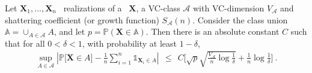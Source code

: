 

\begin{theorem}
\label{colt:thm-princ} 
Let $\mathbf{X}_1,\ldots,\mathbf{X}_n$ \iid~realizations of a \rv~$\mathbf{X}$, a VC-class $\mathcal{A}$ with VC-dimension $V_{\mathcal{A}}$ and shattering coefficient (or growth function) $S_{\mathcal{A}}(n)$.
Consider the class union $\mathbb{A} = \cup_{A \in \mathcal{A}} A$,
 and let  
$p = \mathbb{P}(\mathbf{X} \in \mathbb{A})$. Then there is an absolute constant $C$ such that for all $0<\delta<1$, with probability at least $1-\delta$,
\begin{align}
\label{colt:thm-princ-ineq}
\sup_{A \in \mathcal{A}} \left| \mathbb{P} \big[\mathbf{X} \in A\big] - \frac{1}{n} \sum_{i=1}^n \mathds{1}_{\mathbf{X}_i \in A}  \right| ~~\le~~ C \bigg[ \sqrt{p}\sqrt{\frac{V_{\mathcal{A}}}{n} \log{\frac{1}{\delta}}} + \frac{1}{n} \log{\frac{1}{\delta}} \bigg]~.
\end{align}
\end{theorem}



